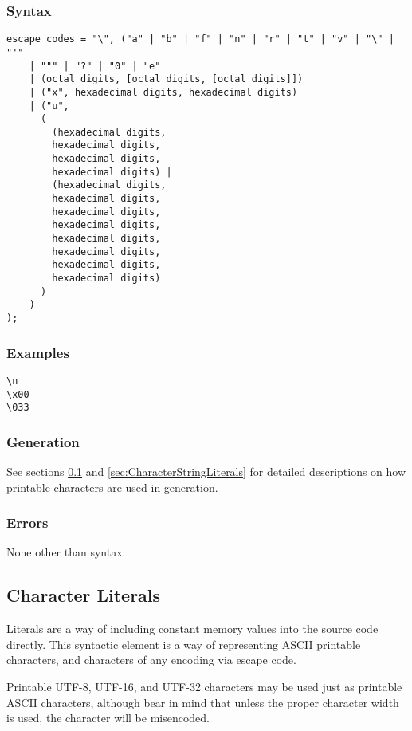 \documentclass[10pt,a4paper]{article}
\begin{document}
\subsubsection{Syntax}
\begin{verbatim}
escape codes = "\", ("a" | "b" | "f" | "n" | "r" | "t" | "v" | "\" | "'"
    | """ | "?" | "0" | "e"
    | (octal digits, [octal digits, [octal digits]])
    | ("x", hexadecimal digits, hexadecimal digits)
    | ("u", 
      (
        (hexadecimal digits,
        hexadecimal digits,
        hexadecimal digits,
        hexadecimal digits) |
        (hexadecimal digits,
        hexadecimal digits,
        hexadecimal digits,
        hexadecimal digits,
        hexadecimal digits,
        hexadecimal digits,
        hexadecimal digits,
        hexadecimal digits)
      )
    )
);
\end{verbatim}

\subsubsection{Examples}
\begin{verbatim}
\n
\x00
\033
\end{verbatim}

\subsubsection{Generation}
See sections \ref{sec:CharacterLiterals} and \ref{sec:CharacterStringLiterals} for detailed descriptions on how printable characters are used in generation.

\subsubsection{Errors}
None other than syntax.

\newpage




\subsection{Character Literals}
\label{sec:CharacterLiterals}
Literals are a way of including constant memory values into the source code directly. This syntactic element is a way of representing ASCII printable characters, and characters of any encoding via escape code.

Printable UTF-8, UTF-16, and UTF-32 characters may be used just as printable ASCII characters, although bear in mind that unless the proper character width is used, the character will be misencoded.
\end{document}
